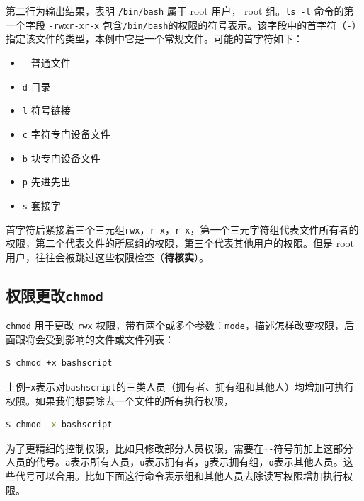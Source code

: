 \documentclass[doctor,openright,twoside]{sjtuthesis}
\providecommand{\tightlist}{%
    \setlength{\itemsep}{0pt}\setlength{\parskip}{0pt}}
\newcommand{\passthrough}[1]{#1}
\theoremstyle{plain}
\theoremstyle{definition}
\theoremstyle{remark}
\theoremstyle{ocrenumbox}
\theoremstyle{plain}
\begin{document}
第二行为输出结果，表明 \passthrough{\lstinline!/bin/bash!} 属于 root
用户， root 组。\passthrough{\lstinline!ls -l!} 命令的第一个字段
\passthrough{\lstinline!-rwxr-xr-x!}
包含\passthrough{\lstinline!/bin/bash!}的权限的符号表示。该字段中的首字符（\passthrough{\lstinline!-!}）指定该文件的类型，本例中它是一个常规文件。可能的首字符如下：

\begin{itemize}
\tightlist
\item
  \passthrough{\lstinline!-!} 普通文件
\item
  \passthrough{\lstinline!d!} 目录
\item
  \passthrough{\lstinline!l!} 符号链接
\item
  \passthrough{\lstinline!c!} 字符专门设备文件
\item
  \passthrough{\lstinline!b!} 块专门设备文件
\item
  \passthrough{\lstinline!p!} 先进先出
\item
  \passthrough{\lstinline!s!} 套接字
\end{itemize}

首字符后紧接着三个三元组\passthrough{\lstinline!rwx!}，\passthrough{\lstinline!r-x!}，\passthrough{\lstinline!r-x!}，第一个三元字符组代表文件所有者的权限，第二个代表文件的所属组的权限，第三个代表其他用户的权限。但是
root 用户，往往会被跳过这些权限检查（\textbf{待核实}）。

\hypertarget{chmod}{%
\subsection{\texorpdfstring{权限更改\texttt{chmod}}{权限更改chmod}}\label{chmod}}

\passthrough{\lstinline!chmod!} 用于更改 \passthrough{\lstinline!rwx!}
权限，带有两个或多个参数：\passthrough{\lstinline!mode!}，描述怎样改变权限，后面跟将会受到影响的文件或文件列表：

\begin{lstlisting}[language=bash]
$ chmod +x bashscript
\end{lstlisting}

上例\passthrough{\lstinline!+x!}表示对\passthrough{\lstinline!bashscript!}的三类人员（拥有者、拥有组和其他人）均增加可执行权限。如果我们想要除去一个文件的所有执行权限，

\begin{lstlisting}[language=bash]
$ chmod -x bashscript
\end{lstlisting}

为了更精细的控制权限，比如只修改部分人员权限，需要在\passthrough{\lstinline!+-!}符号前加上这部分人员的代号。\passthrough{\lstinline!a!}表示所有人员，\passthrough{\lstinline!u!}表示拥有者，\passthrough{\lstinline!g!}表示拥有组，\passthrough{\lstinline!o!}表示其他人员。这些代号可以合用。比如下面这行命令表示组和其他人员去除读写权限增加执行权限。
\end{document}
